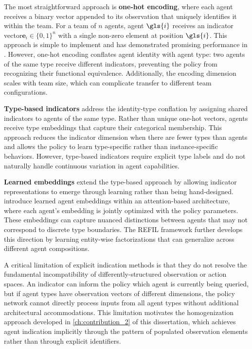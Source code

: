 The most straightforward approach is \textbf{one-hot encoding}, 
where each agent receives a binary vector appended to its 
observation that uniquely identifies it within the team. 
For a team of \(n\) agents, agent \(\gls{i}\) receives an 
indicator vector\(\mathbf{e}_i \in \{0,1\}^n\) with a single 
non-zero element at position \(\gls{i}\). 
This approach is simple to implement and has demonstrated 
promising performance in \cite{terry2020}. 
However, one-hot encoding conflates agent identity with agent type: 
two agents of the same type receive different indicators, 
preventing the policy from recognizing their functional equivalence. 
Additionally, the encoding dimension scales with team size, 
which can complicate transfer to different team configurations.

\textbf{Type-based indicators} address the identity-type conflation by assigning 
shared indicators to agents of the same type. Rather than unique one-hot vectors, 
agents receive type embeddings that capture their categorical membership. 
This approach reduces the indicator dimension when there are fewer types than 
agents and allows the policy to learn type-specific rather than instance-specific behaviors. 
However, type-based indicators require explicit type labels and do not naturally handle 
continuous variation in agent capabilities.

\textbf{Learned embeddings} extend the type-based approach by allowing indicator 
representations to emerge through learning rather than being hand-designed. 
\cite{iqbal2019} introduce learned agent embeddings within an attention-based 
architecture, where each agent's embedding is jointly optimized with the policy parameters. 
These embeddings can capture nuanced distinctions between agents that may not correspond 
to discrete type boundaries. The REFIL framework \cite{iqbal2021} further develops this 
direction by learning entity-wise factorizations that can generalize across different agent 
compositions.

A critical limitation of explicit indication methods is that they do not resolve 
the fundamental incompatibility of differently-structured observation or action spaces. 
An indicator can inform the policy which agent is currently being queried, 
but if agent types have observation vectors of different dimensions, 
the policy network cannot directly process inputs from all agent 
types without additional architectural accommodations. 
This limitation motivates the homogenization approach developed in 
\cref{ch:contribution_2} of this dissertation, which achieves agent indication 
implicitly through the pattern of populated observation elements rather 
than through explicit identifiers.

